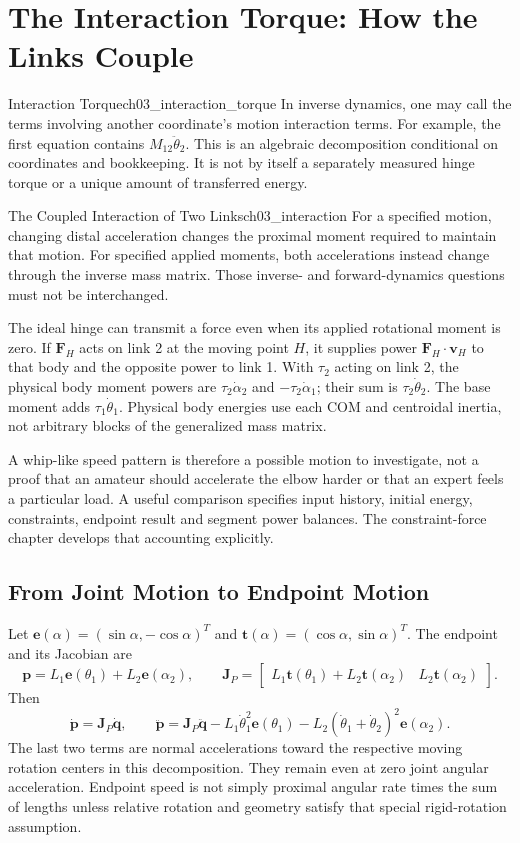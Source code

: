 \section{The Interaction Torque: How the Links Couple}
\begin{definition}{Interaction Torque}{ch03_interaction_torque}
In inverse dynamics, one may call the terms involving another coordinate's motion interaction terms. For example, the first equation contains $M_{12}\ddot\theta_2$. This is an algebraic decomposition conditional on coordinates and bookkeeping. It is not by itself a separately measured hinge torque or a unique amount of transferred energy.
\end{definition}

\begin{example}{The Coupled Interaction of Two Links}{ch03_interaction}
For a specified motion, changing distal acceleration changes the proximal moment required to maintain that motion. For specified applied moments, both accelerations instead change through the inverse mass matrix. Those inverse- and forward-dynamics questions must not be interchanged.

The ideal hinge can transmit a force even when its applied rotational moment is zero. If $\bm F_H$ acts on link 2 at the moving point $H$, it supplies power $\bm F_H\cdot\bm v_H$ to that body and the opposite power to link 1. With $\tau_2$ acting on link 2, the physical body moment powers are $\tau_2\dot\alpha_2$ and $-\tau_2\dot\alpha_1$; their sum is $\tau_2\dot\theta_2$. The base moment adds $\tau_1\dot\theta_1$. Physical body energies use each COM and centroidal inertia, not arbitrary blocks of the generalized mass matrix.

A whip-like speed pattern is therefore a possible motion to investigate, not a proof that an amateur should accelerate the elbow harder or that an expert feels a particular load. A useful comparison specifies input history, initial energy, constraints, endpoint result and segment power balances. The constraint-force chapter develops that accounting explicitly.
\end{example}

\subsection*{From Joint Motion to Endpoint Motion}
Let $\bm e(\alpha)=(\sin\alpha,-\cos\alpha)^T$ and $\bm t(\alpha)=(\cos\alpha,\sin\alpha)^T$. The endpoint and its Jacobian are
\[
\bm p=L_1\bm e(\theta_1)+L_2\bm e(\alpha_2),\qquad
\bm J_P=\begin{bmatrix}L_1\bm t(\theta_1)+L_2\bm t(\alpha_2)&L_2\bm t(\alpha_2)\end{bmatrix}.
\]
Then
\[
\dot{\bm p}=\bm J_P\dot{\bm q},\qquad
\ddot{\bm p}=\bm J_P\ddot{\bm q}
-L_1\dot\theta_1^2\bm e(\theta_1)
-L_2(\dot\theta_1+\dot\theta_2)^2\bm e(\alpha_2).
\]
The last two terms are normal accelerations toward the respective moving rotation centers in this decomposition. They remain even at zero joint angular acceleration. Endpoint speed is not simply proximal angular rate times the sum of lengths unless relative rotation and geometry satisfy that special rigid-rotation assumption.

